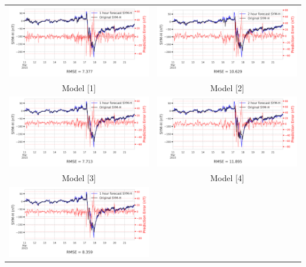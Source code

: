 \documentclass[draft,sw]{agutexSI2019}
\begin{document}
\begin{table}
\centering
\begin{tabular}{cc}
\includegraphics[width=0.49\linewidth]{paper_plots/1h_swics/1h_swics_storm_41.png}
&
\includegraphics[width=0.49\linewidth]{paper_plots/2h_swics/2h_swics_storm_41.png}
\\
Model [1] & Model [2]
\vspace*{12pt}
\\
\includegraphics[width=0.49\linewidth]{paper_plots/1h_no_swics/1h_no_swics_storm_41.png}
&
\includegraphics[width=0.49\linewidth]{paper_plots/2h_no_swics/2h_no_swics_storm_41.png}
\\
Model [3] & Model [4]
\vspace*{12pt}
\\
\includegraphics[width=0.49\linewidth]{paper_plots/1h_swics_model_on_no_swics/1h_swics_model_on_no_swics_storm_41.png}

\end{tabular}
\end{table}
\end{document}

